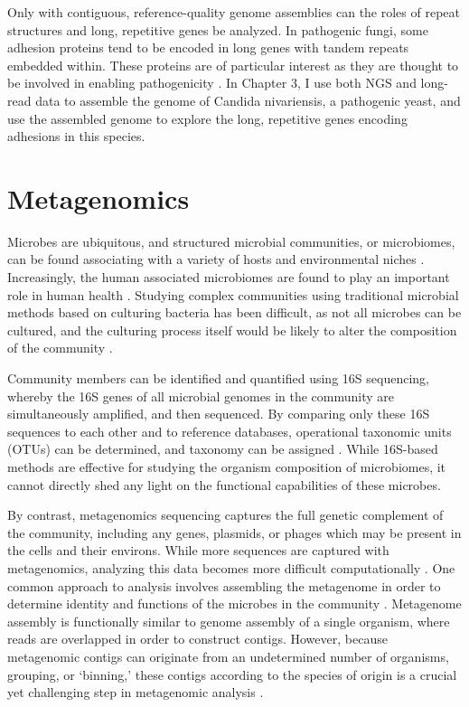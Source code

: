 Only with contiguous, reference-quality genome assemblies can the roles of repeat structures and long, repetitive genes be analyzed. In pathogenic fungi, some adhesion proteins tend to be encoded in long genes with tandem repeats embedded within. These proteins are of particular interest as they are thought to be involved in enabling pathogenicity \citep{Timmermans2018-ci}. In Chapter 3, I use both NGS and long-read data to assemble the genome of Candida nivariensis, a pathogenic yeast, and use the assembled genome to explore the long, repetitive genes encoding adhesions in this species.

\section{Metagenomics}
\label{sec:asm}
Microbes are ubiquitous, and structured microbial communities, or microbiomes, can be found associating with a variety of hosts and environmental niches \citep{Quince2017-ay}. Increasingly, the human associated microbiomes are found to play an important role in human health \citep{Fan2021-hh}. Studying complex communities using traditional microbial methods based on culturing bacteria has been difficult, as not all microbes can be cultured, and the culturing process itself would be likely to alter the composition of the community \citep{Quince2017-ay}.

Community members can be identified and quantified using 16S sequencing, whereby the 16S genes of all microbial genomes in the community are simultaneously amplified, and then sequenced. By comparing only these 16S sequences to each other and to reference databases, operational taxonomic units (OTUs) can be determined, and taxonomy can be assigned \citep{Johnson2019-wk}. While 16S-based methods are effective for studying the organism composition of microbiomes, it cannot directly shed any light on the functional capabilities of these microbes.

By contrast, metagenomics sequencing captures the full genetic complement of the community, including any genes, plasmids, or phages which may be present in the cells and their environs. While more sequences are captured with metagenomics, analyzing this data becomes more difficult computationally \citep{Breitwieser2019-zp}. One common approach to analysis involves assembling the metagenome in order to determine identity and functions of the microbes in the community \citep{Lapidus2021-dj}. Metagenome assembly is functionally similar to genome assembly of a single organism, where reads are overlapped in order to construct contigs. However, because metagenomic contigs can originate from an undetermined number of organisms, grouping, or ‘binning,’ these contigs according to the species of origin is a crucial yet challenging step in metagenomic analysis \citep{Yue2020-cm}.

